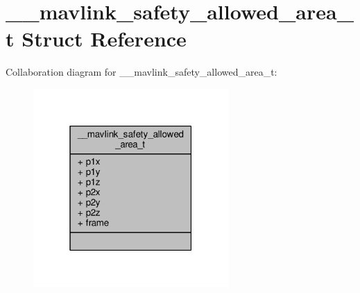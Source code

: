 \hypertarget{struct____mavlink__safety__allowed__area__t}{\section{\+\_\+\+\_\+mavlink\+\_\+safety\+\_\+allowed\+\_\+area\+\_\+t Struct Reference}
\label{struct____mavlink__safety__allowed__area__t}
}


Collaboration diagram for \+\_\+\+\_\+mavlink\+\_\+safety\+\_\+allowed\+\_\+area\+\_\+t\+:
\nopagebreak
\begin{figure}[H]
\begin{center}
\leavevmode
\includegraphics[width=211pt]{struct____mavlink__safety__allowed__area__t__coll__graph}
\end{center}
\end{figure}
